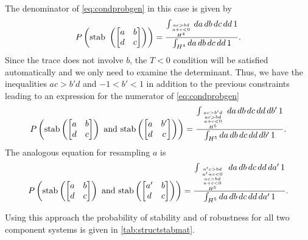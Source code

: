 The denominator of \ref{eq:condprobgen} in this case is given by
\begin{align*}
P\left(\textrm{stab } \left( \begin{bmatrix}
a & b \\
d & c
\end{bmatrix} \right) \right) = \frac{\int_{\genfrac{}{}{0pt}{}{\genfrac{}{}{0pt}{}{ac>bd}{a+c<0}}{H^4}} da\,db\,dc\,dd\,1}{\int_{H^4} da\,db\,dc\,dd\,1}.
\end{align*}
Since the trace does not involve $b$, the $T<0$ condition will be satisfied automatically and we only need to examine the determinant. Thus, we have the inequalities $ac > b'd$ and $-1 < b' < 1$ in addition to the previous constraints leading to an expression for the numerator of \ref{eq:condprobgen}
\begin{align*}
P\left(\textrm{stab} \left( \begin{bmatrix}
a & b \\
d & c
\end{bmatrix} \right) \textrm{ and stab} \left( \begin{bmatrix}
a & b' \\
d & c
\end{bmatrix} \right) \right) = \frac{\int_{{{ac>b'd \atop ac>bd} \atop a+c<0} \atop H^5} da\,db\,dc\,dd\,db'\,1}{\int_{H^5} da\,db\,dc\,dd\,db'\,1}.
\end{align*}
The analogous equation for resampling $a$ is
\begin{align*}
P\left(\textrm{stab} \left( \begin{bmatrix}
a & b \\
d & c
\end{bmatrix} \right) \textrm{ and stab} \left( \begin{bmatrix}
a' & b \\
d & c
\end{bmatrix} \right) \right) = \frac{\int_{{{{a'c>bd \atop a' + c < 0} \atop ac>bd} \atop a+c<0} \atop H^5} da\,db\,dc\,dd\,da'\,1}{\int_{H^5} da\,db\,dc\,dd\,da'\,1}.
\end{align*}

Using this approach the probability of stability and of robustness for all two component systems is given in \ref{tab:structstabmat}.


